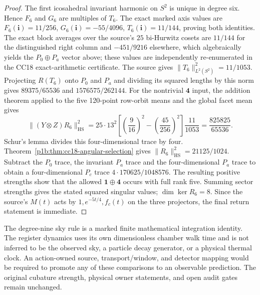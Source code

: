 \documentclass[11pt]{article}
\begin{document}
\begin{proof}
The first icosahedral invariant harmonic on $S^2$ is unique in degree
six.  Hence $F_6$ and $G_6$ are multiples of $T_6$.  The exact marked
axis values are
$F_6(\mathbf i)=11/256$, $G_6(\mathbf i)=-55/4096$,
$T_6(\mathbf i)=11/144$, proving both identities.  The exact
block averages over the source's $25$ bi-Hurwitz cosets are
$11/144$ for the distinguished right column and $-451/9216$
elsewhere, which algebraically yields the $P_0\oplus P_a$ vector
above; these values are independently re-enumerated in the CC18
exact-arithmetic certificate.  The source gives
$\|T_6\|_{L^2(S^2)}^2=11/1053$.
Projecting $R(T_6)$ onto $P_0$ and $P_a$ and dividing its squared
lengths by this norm gives
$89375/65536$ and $1576575/262144$.
For the nontrivial $\mathbf4$ input, the addition theorem applied to
the five 120-point row-orbit means and the global facet mean gives
\[
\|(Y\otimes Z)R_6\|_{\mathrm{HS}}^2
=25\cdot13^2\left[\left(\frac9{16}\right)^2
-\left(\frac{45}{256}\right)^2\right]\frac{11}{1053}
=\frac{825825}{65536}.
\]
Schur's lemma divides this four-dimensional trace by four.
Theorem~\ref{p1b:thm:cc18-angular-selection} gives
$\|R_6\|_{\mathrm{HS}}^2=21125/1024$.  Subtract the $P_0$
trace, the invariant $P_a$ trace and the four-dimensional $P_a$
trace to obtain a four-dimensional $P_c$ trace
$4\cdot170625/1048576$.  The resulting positive strengths show
that the allowed $\mathbf1\oplus\mathbf4$ occurs with full rank
five.  Summing sector strengths gives the stated squared singular
values; $\dim\ker R_6=8$.  Since the source's $M(t)$ acts by
$1,e^{-5t/4},f_c(t)$ on the three projectors, the final return
statement is immediate.
\end{proof}

\begin{remark}
\label{p1b:rem:cc18-physical-gates}
The degree-nine sky rule is a marked finite mathematical integration
identity.  The register dynamics uses its own dimensionless chamber
walk time and is not inferred to be the observed sky, a particle decay
generator, or a physical thermal clock.  An action-owned source,
transport/window, and detector mapping would be required to promote
any of these comparisons to an observable prediction.  The original
cubature strength, physical owner statements, and open audit gates
remain unchanged.
\end{remark}
\end{document}
